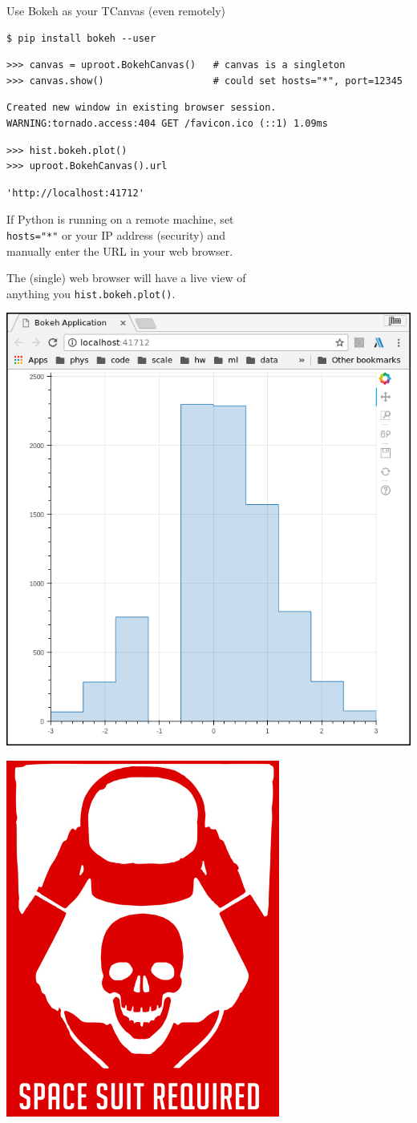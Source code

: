 \documentclass[aspectratio=169]{beamer}
\begin{document}
\begin{frame}[fragile]{Use Bokeh as your TCanvas (even remotely)}
\vspace{0.25 cm}
\small
\begin{verbatim}
$ pip install bokeh --user
\end{verbatim}
\begin{verbatim}
>>> canvas = uproot.BokehCanvas()   # canvas is a singleton
>>> canvas.show()                   # could set hosts="*", port=12345
\end{verbatim}
\begin{verbatim}
Created new window in existing browser session.
WARNING:tornado.access:404 GET /favicon.ico (::1) 1.09ms
\end{verbatim}
\begin{verbatim}
>>> hist.bokeh.plot()
>>> uproot.BokehCanvas().url
\end{verbatim}
\begin{verbatim}
'http://localhost:41712'
\end{verbatim}

\vspace{0.2 cm}
If Python is running on a remote machine, set \\
{\tt hosts="*"} or your IP address (security) and \\
manually enter the URL in your web browser.

\vspace{0.2 cm}
The (single) web browser will have a live view of \\
anything you {\tt hist.bokeh.plot()}.

\vspace{-4.25 cm}
\hfill \includegraphics[height=4.5 cm]{bokeh_plot.png}\hspace{1 cm}

\vspace{-2.1 cm}
\hfill \includegraphics[width=1.5 cm]{danger.png}\hspace{-0.9 cm}
\vspace{3 cm}
\end{frame}
\end{document}
